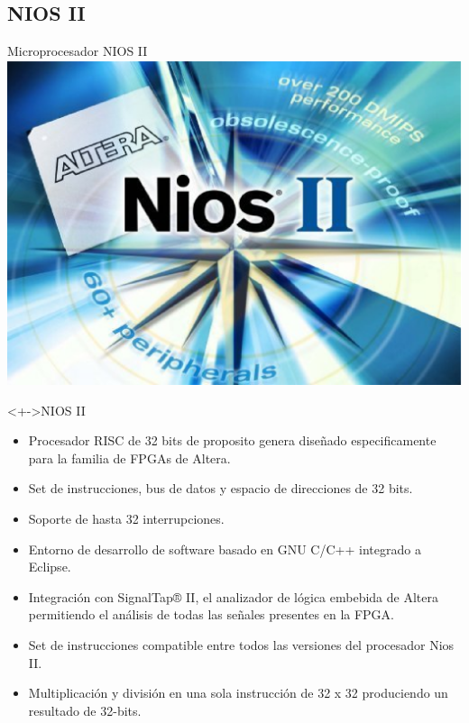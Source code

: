 \documentclass[xcolor=dvipsnames]{beamer}
\begin{document}
\subsection{NIOS II}
\begin{frame}{Microprocesador NIOS II}
\center
\includegraphics[scale=0.20]{figures/nios2.eps}
   \begin{block}<+->{NIOS II}	
    \begin{itemize}
	\scriptsize
     	\item Procesador RISC de 32 bits de proposito genera diseñado especificamente para la familia de FPGAs de Altera.
	\item Set de instrucciones, bus de datos y espacio de direcciones de 32 bits.
	\item Soporte de hasta 32 interrupciones.
	\item Entorno de desarrollo de software basado en GNU C/C++ integrado a Eclipse.
	\item Integración con SignalTap® II, el analizador de lógica embebida de Altera permitiendo el análisis  de todas las señales presentes en la FPGA.
	\item Set de instrucciones compatible entre todos las versiones del procesador Nios II.
	\item Multiplicación y división en una sola instrucción de 32 x 32 produciendo un resultado de 32-bits.
    \end{itemize}
	
  \end{block}
\end{frame}
\end{document}
